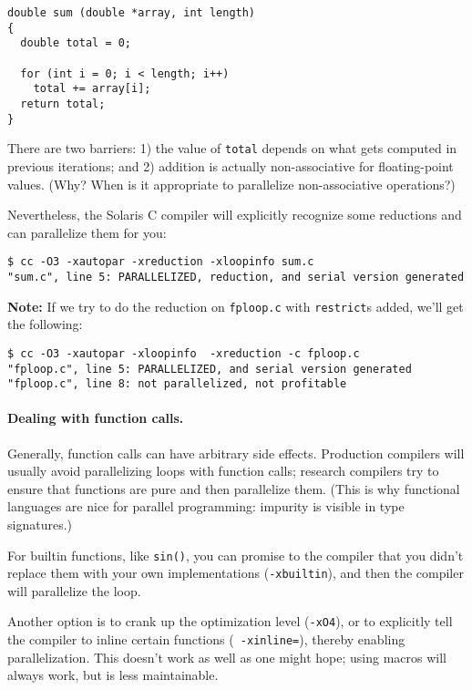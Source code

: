 {
\begin{verbatim}
double sum (double *array, int length)
{
  double total = 0;

  for (int i = 0; i < length; i++)
    total += array[i];
  return total;
}
\end{verbatim}
}

There are two barriers: 1) the value of {\tt total} depends on what
gets computed in previous iterations; and 2) addition is actually
non-associative for floating-point values. ({\sf Why? When is it
appropriate to parallelize non-associative operations?})

Nevertheless, the Solaris C compiler will explicitly recognize
some reductions and can parallelize them for you:

{
\begin{verbatim}
$ cc -O3 -xautopar -xreduction -xloopinfo sum.c
"sum.c", line 5: PARALLELIZED, reduction, and serial version generated
\end{verbatim}
}

{\bf Note:}  If we try to do the reduction on {\tt fploop.c} with {\tt restrict}s added, we'll get the following:

\begin{verbatim}
$ cc -O3 -xautopar -xloopinfo  -xreduction -c fploop.c
"fploop.c", line 5: PARALLELIZED, and serial version generated
"fploop.c", line 8: not parallelized, not profitable
\end{verbatim}

\paragraph{Dealing with function calls.} Generally, function calls
can have arbitrary side effects. Production compilers will usually
avoid parallelizing loops with function calls; research compilers try
to ensure that functions are pure and then parallelize them.
(This is why functional languages are nice for parallel
programming: impurity is visible in type signatures.)

For builtin functions, like {\tt sin()}, you can promise to the 
compiler that you didn't replace them with your own implementations
({\tt -xbuiltin}), and then the compiler will parallelize the loop.

Another option is to crank up the optimization level ({\tt -xO4}), or
to explicitly tell the compiler to inline certain functions ({\tt
  -xinline=}), thereby enabling parallelization. This doesn't work as
well as one might hope; using macros will always work, but is less maintainable.

